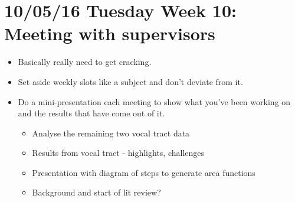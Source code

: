 \documentclass{article}
\begin{document}
\section*{10/05/16 Tuesday Week 10: Meeting with supervisors}
\begin{itemize}
    \item Basically really need to get cracking.
    \item Set aside weekly slots like a subject and don't deviate from it.
    \item Do a mini-presentation each meeting to show what you've been working on and the results that have come out of it.
    \begin{itemize}
        \item Analyse the remaining two vocal tract data
        \item Results from vocal tract - highlights, challenges
        \item Presentation with diagram of steps to generate area functions
        \item Background and start of lit review?
    \end{itemize}
\end{itemize}
\end{document}
